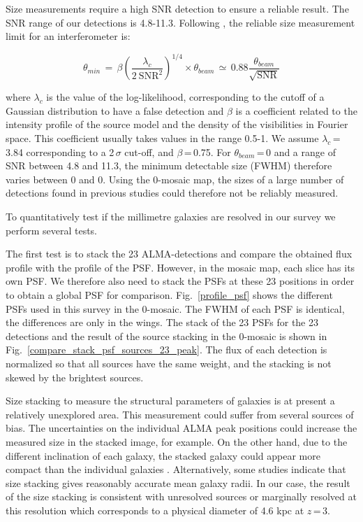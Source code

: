 \documentclass[longauth]{aa}
\begin{document}
Size measurements require a high SNR detection to ensure a reliable result. The SNR range of our detections is 4.8-11.3. Following \cite{Marti-Vidal2012}, the reliable size measurement limit for an interferometer is:

\begin{equation}
\theta_{min}\,=\,\beta \left(   \frac{\lambda_c}{2 \ \text{SNR}^2}    \right)^{1/4} \times \theta_{beam}\,\simeq\,0.88\frac{\theta_{beam}}{\sqrt{\text{SNR}}}
\end{equation}

\noindent where $\lambda_c$ is the value of the log-likelihood, corresponding to the cutoff of a Gaussian distribution to have a false detection and $\beta$ is a coefficient related to the intensity profile of the source model and the density of the visibilities in Fourier space. This coefficient usually takes values in the range 0.5-1. We assume $\lambda_c$\,=\,3.84 corresponding to a 2\,$\sigma$ cut-off, and $\beta$\,=\,0.75. For $\theta_{beam}$\,=\,0 and a range of SNR between 4.8 and 11.3, the minimum detectable size (FWHM) therefore varies between 0 and 0. Using the 0-mosaic map, the sizes of a large number of detections found in previous studies could therefore not be reliably measured.

To quantitatively test if the millimetre galaxies are resolved in our survey we perform several tests.

The first test is to stack the 23 ALMA-detections and compare the obtained flux profile with the profile of the PSF. However, in the mosaic map, each slice has its own PSF. We therefore also need to stack the PSFs at these 23 positions in order to obtain a global PSF for comparison. Fig.~\ref{profile_psf} shows the different PSFs used in this survey in the 0-mosaic. The FWHM of each PSF is identical, the differences are only in the wings. The stack of the 23 PSFs for the 23 detections and the result of the source stacking in the 0-mosaic is shown in Fig.~\ref{compare_stack_psf_sources_23_peak}. The flux of each detection is normalized so that all sources have the same weight, and the stacking is not skewed by the brightest sources. 

Size stacking to measure the structural parameters of galaxies is at present a relatively unexplored area. This measurement could suffer from several sources of bias. The uncertainties on the individual ALMA peak positions could increase the measured size in the stacked image, for example. On the other hand, due to the different inclination of each galaxy, the stacked galaxy could appear more compact than the individual galaxies \mbox{\citep[eg.][]{Hao2006,Padilla2008,Li2016}}. Alternatively, some studies \citep[eg.][]{VanDokkum2010} indicate that size stacking gives reasonably accurate mean galaxy radii. In our case, the result of the size stacking is consistent with unresolved sources or marginally resolved at this resolution which corresponds to a physical diameter of 4.6 kpc at $z$\,=\,3.
\end{document}

